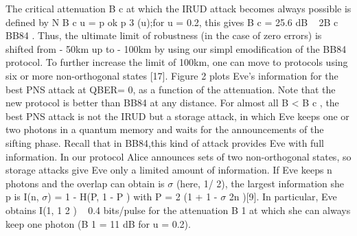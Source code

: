 The critical attenuation B c at which the IRUD attack becomes always possible is defined by N B c u = p ok p 3 (u);for u = 0.2, this gives B c = 25.6 dB ~ 2B c BB84 . Thus, the ultimate limit of robustness (in the case of zero errors) is shifted from - 50km up to - 100km by using our simpl emodification of the BB84 protocol. To further increase the limit of 100km, one can move to protocols using six or more non-orthogonal states [17].
Figure 2 plots Eve’s information for the best PNS attack at QBER= 0, as a function of the attenuation. Note that the new protocol is better than BB84 at any distance. For almost all B < B c , the best PNS attack is not the IRUD but a storage attack, in which Eve keeps one or two photons in a quantum memory and waits for the announcements of the sifting phase. Recall that in BB84,this kind of attack provides Eve with full information. In our protocol Alice announces sets of two non-orthogonal states, so storage attacks give Eve only a limited amount of information.
 If Eve keeps n photons and the overlap can obtain is $\sigma$ (here, 1/ 2), the largest information she p is I(n, $\sigma$) = 1 - H(P, 1 - P ) with P = 2 (1 + 1 - $\sigma$ 2n )[9]. In particular, Eve obtains I(1,  1 2 ) ~ 0.4 bits/pulse for the attenuation B 1 at which she can always keep one photon (B 1 = 11 dB for u = 0.2).

